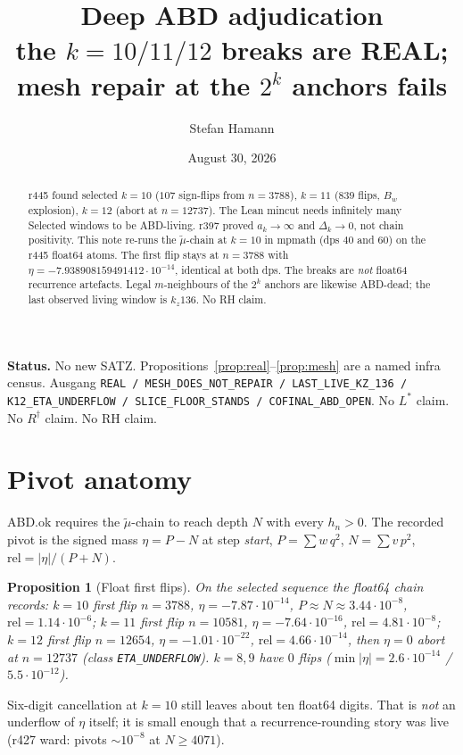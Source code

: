 \documentclass[11pt]{article}
\title{\bfseries Deep ABD adjudication\\[2mm]
\large the $k=10/11/12$ breaks are REAL;\\
mesh repair at the $2^k$ anchors fails}
\author{Stefan Hamann}
\date{August 30, 2026}
\newtheorem{prop}{Proposition}
\begin{document}
\maketitle

\begin{abstract}\noindent
r445 found selected $k=10$ ($107$ sign-flips from
$n=3788$), $k=11$ ($839$ flips, $B_w$ explosion),
$k=12$ (abort at $n=12737$).
The Lean mincut needs infinitely many Selected
windows to be ABD-living.
r397 proved $a_k\to\infty$ and $\Delta_k\to 0$,
not chain positivity.
This note re-runs the $\tilde\mu$-chain at
$k=10$ in mpmath (dps $40$ and $60$) on the
r445 float64 atoms.
The first flip stays at $n=3788$ with
$\eta=-7.938908159491412\cdot 10^{-14}$,
identical at both dps.
The breaks are \emph{not} float64 recurrence
artefacts.
Legal $m$-neighbours of the $2^k$ anchors are
likewise ABD-dead; the last observed living
window is $k_z136$.
No RH claim.
\end{abstract}

\medskip\noindent
\textbf{Status.}\enspace
No new SATZ.
Propositions~\ref{prop:real}--\ref{prop:mesh} are a
named infra census.
Ausgang
\texttt{REAL / MESH\_DOES\_NOT\_REPAIR / LAST\_LIVE\_KZ\_136 / K12\_ETA\_UNDERFLOW / SLICE\_FLOOR\_STANDS / COFINAL\_ABD\_OPEN}.
No $L^{*}$ claim.  No $R^{\dagger}$ claim.  No RH claim.

\section{Pivot anatomy}\label{sec:anat}

ABD.ok requires the $\tilde\mu$-chain to reach
depth $N$ with every $h_n>0$.
The recorded pivot is the signed mass
$\eta=P-N$ at step \emph{start},
$P=\sum w\,q^2$, $N=\sum v\,p^2$,
$\mathrm{rel}=|\eta|/(P+N)$.

\begin{prop}[Float first flips]\label{prop:float}
On the selected sequence the float64 chain
records:
$k=10$ first flip $n=3788$,
$\eta=-7.87\cdot 10^{-14}$,
$P\approx N\approx 3.44\cdot 10^{-8}$,
$\mathrm{rel}=1.14\cdot 10^{-6}$;
$k=11$ first flip $n=10581$,
$\eta=-7.64\cdot 10^{-16}$,
$\mathrm{rel}=4.81\cdot 10^{-8}$;
$k=12$ first flip $n=12654$,
$\eta=-1.01\cdot 10^{-22}$,
$\mathrm{rel}=4.66\cdot 10^{-14}$,
then $\eta=0$ abort at $n=12737$
(class \texttt{ETA\_UNDERFLOW}).
$k=8,9$ have $0$ flips
($\min|\eta|=2.6\cdot 10^{-14}$ / $5.5\cdot 10^{-12}$).
\end{prop}

Six-digit cancellation at $k=10$ still leaves
about ten float64 digits.
That is \emph{not} an underflow of $\eta$ itself;
it is small enough that a recurrence-rounding
story was live (r427 ward: pivots $\sim 10^{-8}$
at $N\ge 4071$).
\end{document}
